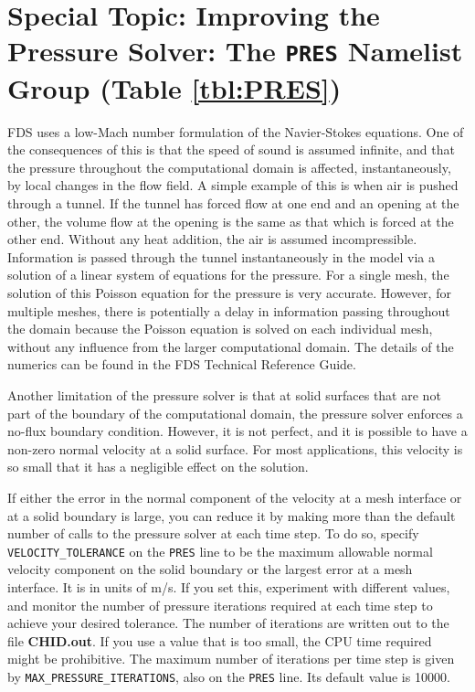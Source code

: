 \documentclass[11pt]{book}
\newcommand{\ct}{\tt\small}
\begin{document}
\section{Special Topic: Improving the Pressure Solver: The \texorpdfstring{{\tt PRES}}{PRES} Namelist Group (Table \ref{tbl:PRES})}
\label{info:PRES}

FDS uses a low-Mach number formulation of the Navier-Stokes equations. One of the consequences of this is that the speed of sound is
assumed infinite, and that the pressure throughout the computational domain is affected, instantaneously, by local changes in the flow field. A simple example of
this is when air is pushed through a tunnel. If the tunnel has forced flow at one end and an opening at the other, the volume flow at the opening is the same
as that which is forced at the other end. Without any heat addition, the air is assumed incompressible. Information is passed through the tunnel
instantaneously in the model via a solution of a linear system of equations for the pressure. For a single mesh, the solution of this Poisson equation for
the pressure is very accurate. However, for multiple meshes, there is potentially a delay in information passing throughout the domain because the Poisson
equation is solved on each individual mesh, without any influence from the larger computational domain. The details of the numerics can be found in the
FDS Technical Reference Guide.


Another limitation of the pressure solver is that at solid surfaces that are not part of the boundary of the computational domain,
the pressure solver enforces a no-flux boundary condition. However, it is not perfect, and
it is possible to have a non-zero normal velocity at a solid surface. For most applications, this velocity is so small that it has a negligible effect on the solution.

If either the error in the normal component of the velocity at a mesh interface or at a solid boundary is large, you
can reduce it by making more than the default number of calls to the pressure solver at each time step.
To do so, specify {\ct VELOCITY\_TOLERANCE} on the {\ct PRES} line to be the maximum allowable normal velocity component on the solid
boundary or the largest error at a mesh interface. It is in units of m/s.
If you set this, experiment with different values, and monitor the number of pressure iterations required at each time step to achieve your
desired tolerance. The number of iterations are written out to the file {\bf CHID.out}. If you use a value that is too small, the CPU time required might be prohibitive.
The maximum number of iterations per time step is given by {\ct MAX\_PRESSURE\_ITERATIONS}, also on the {\ct PRES} line. Its default value is 10000.
\end{document}
